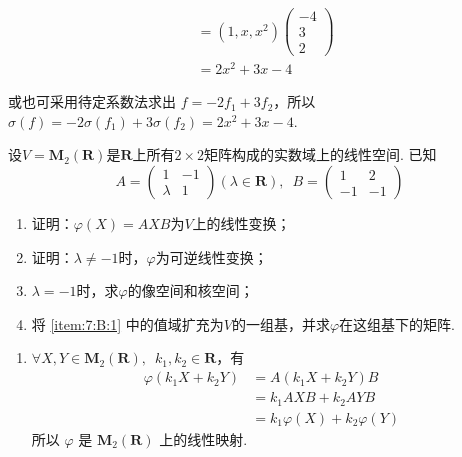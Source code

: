 \begin{exercise}
\begin{exgroup}
\begin{answer}
\begin{enumerate}
\begin{align*}
                                    & = (1, x, x^2)
                          \begin{pmatrix} -4 \\ 3 \\ 2 \end{pmatrix}                          \\
                                    & = 2x^2 + 3x - 4
                      \end{align*}

                      或也可采用待定系数法求出 $ f = -2 f_1 + 3 f_2 $，所以 $ \sigma(f) = -2 \sigma(f_1) + 3 \sigma(f_2) = 2x^2 + 3x - 4 $.
            \end{enumerate}
        \end{answer}

        \item 设$V=\mathbf{M}_2(\mathbf{R})$是$\mathbf{R}$上所有$2 \times 2$矩阵构成的实数域上的线性空间. 已知
        \[A=\begin{pmatrix}1 & -1 \\ \lambda & 1 \end{pmatrix}(\lambda \in \mathbf{R}),\enspace B=\begin{pmatrix}1 & 2 \\ -1 & -1 \end{pmatrix}\]
        \begin{enumerate}
            \item 证明：$\varphi(X)=AXB$为$V$上的线性变换；

            \item 证明：$\lambda\neq-1$时，$\varphi$为可逆线性变换；

            \item \label{item:7:B:1}
                  $\lambda=-1$时，求$\varphi$的像空间和核空间；

            \item 将 \ref*{item:7:B:1} 中的值域扩充为$V$的一组基，并求$\varphi$在这组基下的矩阵.
        \end{enumerate}

        \begin{answer}
            \begin{enumerate}
                \item $ \forall X, Y \in \mathbf{M}_2(\mathbf{R}),\enspace k_1, k_2 \in \mathbf{R} $，有
                      \begin{align*}
                          \varphi(k_1 X + k_2 Y) & = A(k_1 X + k_2 Y)B               \\
                                                 & = k_1 A X B + k_2 A Y B           \\
                                                 & = k_1 \varphi(X) + k_2 \varphi(Y)
                      \end{align*}
                      所以 $ \varphi $ 是 $ \mathbf{M}_2(\mathbf{R}) $ 上的线性映射.


\end{enumerate}
\end{answer}
\end{exgroup}
\end{exercise}
